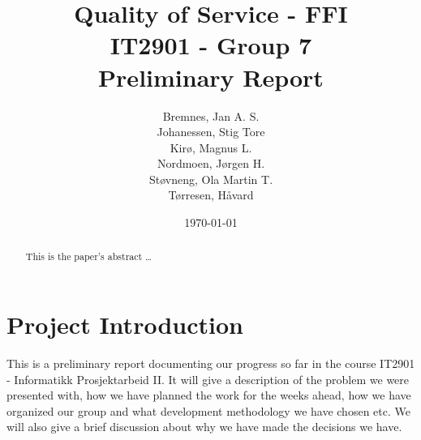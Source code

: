 \documentclass[12pt]{article}
\title{
    Quality of Service - FFI \\
    IT2901 - Group 7  \\ 
    Preliminary Report \\
}
\author{
    Bremnes, Jan A. S. \\  
    Johanessen, Stig Tore \\
    Kirø, Magnus L.\\
    Nordmoen, Jørgen H.\\ 
    Støvneng, Ola Martin T.\\
    Tørresen, Håvard \\
}
\date{\today}
\begin{document}
\maketitle
\titlepage
{}
\newpage

\begin{abstract}\label{abstract}
This is the paper's abstract \ldots
\end{abstract}

\tableofcontents
\listoffigures
\listoftables
\newpage

\section{Project Introduction}\label{intoduction}
    This is a preliminary report documenting our progress so far in the course IT2901 - Informatikk Prosjektarbeid II. It will give a description of the problem we were presented with, how we have planned the work for the weeks ahead, how we have organized our group and what development methodology we have chosen etc. We will also give a brief discussion about why we have made the decisions we have.











\appendix





\end{document}
